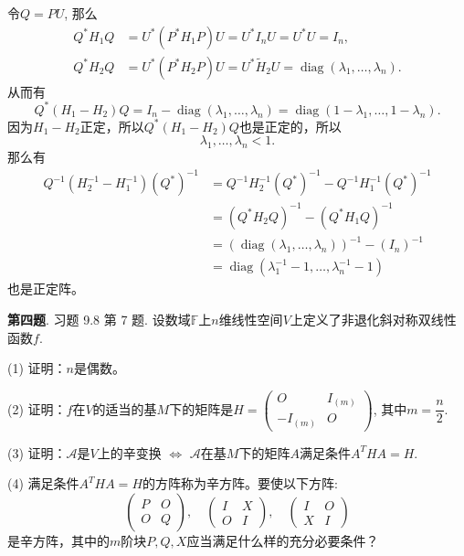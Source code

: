 令$Q = PU$, 那么
\begin{align*}
Q^* H_1 Q & = U^* \left( P^* H_1 P \right) U = U^* I_n U = U^* U = I_n, \\
Q^* H_2 Q & = U^* \left( P^* H_2 P \right) U = U^* \widetilde{H}_2 U = \operatorname{diag} (\lambda_1, \ldots, \lambda_n).
\end{align*}
从而有
$$Q^* (H_1 - H_2) Q = I_n - \operatorname{diag} (\lambda_1, \ldots, \lambda_n) = \operatorname{diag} (1-\lambda_1, \ldots, 1-\lambda_n).$$
因为$H_1 - H_2$正定，所以$Q^* (H_1 - H_2) Q$也是正定的，所以
$$\lambda_1, \ldots, \lambda_n < 1.$$
那么有
\begin{align*}
 Q^{-1} \left( H_2^{-1} - H_1^{-1} \right) \left( Q^* \right)^{-1} & = Q^{-1} H_2^{-1} \left( Q^* \right)^{-1} - Q^{-1} H_1^{-1} \left( Q^* \right)^{-1} \\
& = \left( Q^* H_2 Q \right)^{-1} - \left( Q^* H_1 Q \right)^{-1} \\
& = \left( \operatorname{diag} (\lambda_1, \ldots, \lambda_n) \right)^{-1} - \left( I_n \right)^{-1} \\
& = \operatorname{diag} (\lambda_1^{-1} - 1, \ldots, \lambda_n^{-1} - 1)
\end{align*}
也是正定阵。


\newpageorvspace


{\bf 第四题}. 习题 9.8 第 7 题. 设数域$\mathbb{F}$上$n$维线性空间$V$上定义了非退化斜对称双线性函数$f$.

(1) 证明：$n$是偶数。

(2) 证明：$f$在$V$的适当的基$M$下的矩阵是$H = \begin{pmatrix} O & I_{(m)} \\ -I_{(m)} & O \end{pmatrix}$, 其中$m = \dfrac{n}{2}$.

(3) 证明：$\mathcal{A}$是$V$上的辛变换 $\Leftrightarrow$ $\mathcal{A}$在基$M$下的矩阵$A$满足条件$A^THA = H$.

(4) 满足条件$A^THA = H$的方阵称为辛方阵。要使以下方阵:
$$
\begin{pmatrix} P & O \\ O & Q \end{pmatrix}, \quad
\begin{pmatrix} I & X \\ O & I \end{pmatrix}, \quad
\begin{pmatrix} I & O \\ X & I \end{pmatrix}
$$
是辛方阵，其中的$m$阶块$P, Q, X$应当满足什么样的充分必要条件？

